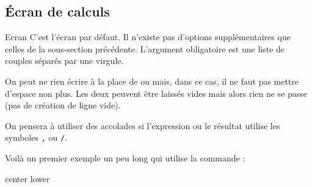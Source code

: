 \documentclass[10pt,french,a4paper]{article}
\begin{document}
\subsection{\'Ecran de calculs}

\begin{docCommand}{Ecran}{}
    C'est l'écran par défaut. Il n'existe pas d'options supplémentaires que celles de la sous-section précédente. L'argument obligatoire est une liste de couples  séparés par une virgule.\par
    On peut ne rien écrire à la place de  ou  mais, dans ce cas, il ne faut pas mettre d'espace non plus. Les deux peuvent être laissés vides mais alors rien ne se passe (pas de création de ligne vide).\par
    On pensera à utiliser des accolades si l'expression ou le résultat utilise les symboles \texttt{,} ou \texttt{/}.
\end{docCommand}\bigskip

\noindent Voilà un premier exemple un peu long qui utilise la commande  :\smallskip

\begin{dispExample*}{center lower}
\end{dispExample*}
\end{document}
